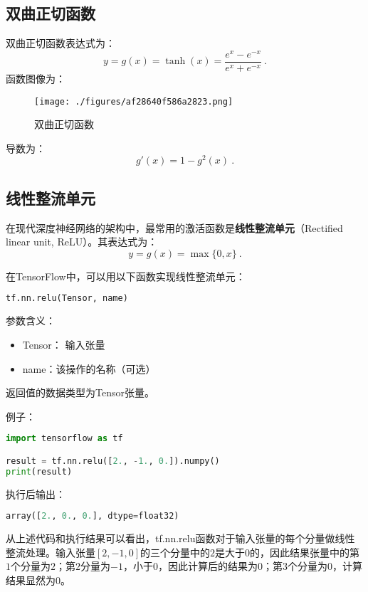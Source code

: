 \subsection{双曲正切函数}
双曲正切函数表达式为：
\begin{equation}
y=g(x)=\tanh(x)=\frac{e^x-e^{-x}}{e^x+e^{-x}}~.
\end{equation}
函数图像为：
\begin{figure}[ht]
\centering
\texttt{[image: ./figures/af28640f586a2823.png]}
\caption{双曲正切函数} \label{fig_ActFun3}
\end{figure}
导数为：
\begin{equation}
g'(x)=1-g^2(x)~.
\end{equation}

\subsection{线性整流单元}
在现代深度神经网络的架构中，最常用的激活函数是\textbf{线性整流单元}（Rectified linear unit, ReLU）。其表达式为：
\begin{equation}
y=g(x)=\max\{0,x\}~.
\end{equation}

在TensorFlow中，可以用以下函数实现线性整流单元：
\begin{lstlisting}[language=python]
tf.nn.relu(Tensor, name)
\end{lstlisting}

参数含义：
\begin{itemize}
\item Tensor： 输入张量 \\
\item name：该操作的名称（可选） \\
\end{itemize}
返回值的数据类型为Tensor张量。

例子：
\begin{lstlisting}[language=python]
import tensorflow as tf

result = tf.nn.relu([2., -1., 0.]).numpy()
print(result)
\end{lstlisting}
执行后输出：
\begin{lstlisting}[language=python]
array([2., 0., 0.], dtype=float32)
\end{lstlisting}

从上述代码和执行结果可以看出，tf.nn.relu函数对于输入张量的每个分量做线性整流处理。输入张量$[2, -1, 0]$的三个分量中的$2$是大于$0$的，因此结果张量中的第$1$个分量为$2$；第$2$分量为$-1$，小于$0$，因此计算后的结果为$0$；第$3$个分量为$0$，计算结果显然为$0$。
